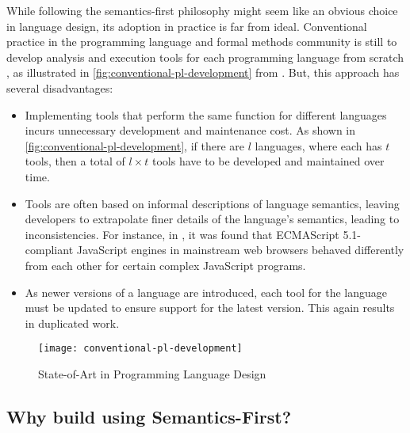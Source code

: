 While following the semantics-first philosophy might seem like an obvious choice
in language design, its adoption in practice is far from ideal.
Conventional practice in the programming language and formal
methods community is still to develop analysis and execution tools for each
programming language from scratch \cite{ChenSETSS19}, as illustrated
in \autoref{fig:conventional-pl-development} from
\cite{ChenSETSS19}. But, this approach has several
disadvantages:
\begin{itemize}
  \item Implementing tools that perform the same function for
    different languages incurs unnecessary development and maintenance cost.
    As shown in \autoref{fig:conventional-pl-development}, if there are
    $l$ languages, where each has $t$ tools, then a total of $l \times t$
    tools have to be developed and maintained over time.
  \item Tools are often based on informal descriptions of language semantics,
    leaving developers to extrapolate finer details of the language's semantics,
    leading to inconsistencies.
    For instance, in \cite{ParkPLDI15}, it was found
    that ECMAScript 5.1-compliant JavaScript engines
    in mainstream web browsers behaved differently from each other
    for certain complex JavaScript programs.
  \item As newer versions of a language are introduced, each
    tool for the language must be updated to ensure support for the latest
    version. This again results in duplicated work.
\end{itemize}
\begin{figure}[t!]
  \centering
  \texttt{[image: conventional-pl-development]}
  \caption{State-of-Art in Programming Language Design}\label{fig:conventional-pl-development}
\end{figure}

\subsection{Why build \CDSSs{} using Semantics-First?}\label{sec:why-use-semantics-first}

